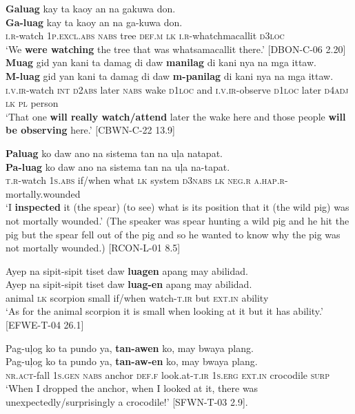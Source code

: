 \ea
\textbf{Galuag}  kay  ta  kaoy  an  na  gakuwa  don. \\\smallskip
\gll \textbf{Ga-luag}  kay  ta  kaoy  an  na  ga-kuwa  don. \\
\textsc{i.r}-watch  1\textsc{p.excl.abs}  \textsc{nabs}  tree  \textsc{def.m}  \textsc{lk}  \textsc{i.r}-whatchmacallit  \textsc{d3loc} \\
\glt ‘We \textbf{were watching} the tree that was whatsamacallit there.’ [DBON-C-06 2.20]
\z
\ea
\textbf{Muag}  gid  yan  kani  ta  damag  di  daw  \textbf{manilag} di kani  nya  na  mga  ittaw. \\\smallskip
\gll \textbf{M-luag}  gid  yan  kani  ta  damag  di  daw  \textbf{m-panilag} di kani  nya  na  mga  ittaw. \\
\textsc{i.v.ir}-watch  \textsc{int}  \textsc{d2abs}  later  \textsc{nabs}  wake  \textsc{d1loc}  and  \textsc{i.v.ir}-observe
\textsc{d1loc} later  \textsc{d4adj}  \textsc{lk}  \textsc{pl} person \\
\glt `That one \textbf{will really watch/attend} later the wake here and those people \textbf{will be observing} here.’ [CBWN-C-22 13.9]
\z

\ea
\textbf{Paluag}  ko  daw  ano  na  sistema  tan  na  uļa natapat. \\\smallskip
\gll \textbf{Pa-luag}  ko  daw  ano  na  sistema  tan  na  uļa na-tapat. \\
\textsc{t.r}-watch  1\textsc{s.abs}  if/when  what  \textsc{lk}  system  \textsc{d3nabs}  \textsc{lk}  \textsc{neg.r} \textsc{a.hap.r}-mortally.wounded \\
\glt `I \textbf{inspected} it (the spear) (to see) what is its position that it (the wild pig) was not mortally wounded.’ (The speaker was spear hunting a wild pig and he hit the pig but the spear fell out of the pig and so he wanted to know why the pig was not mortally wounded.) [RCON-L-01 8.5]
\z

\ea
Ayep  na  sipit-sipit  tiset  daw  \textbf{luagen}  apang   may  abilidad. \\\smallskip
\gll Ayep  na  sipit-sipit  tiset  daw  \textbf{luag-en}  apang   may  abilidad. \\
animal  \textsc{lk}  scorpion  small  if/when  watch-\textsc{t.ir}  but  \textsc{ext.in}  ability \\
\glt ‘As for the animal scorpion it is small when looking at it but it has ability.’ [EFWE-T-04 26.1]
\z

\ea
Pag-uļog  ko  ta  pundo   ya,  \textbf{tan-awen}  ko,  may  bwaya  plang. \\\smallskip
\gll Pag-uļog  ko  ta  pundo   ya,  \textbf{tan-aw-en}  ko,  may  bwaya  plang. \\
\textsc{nr.act}-fall  1\textsc{s.gen}  \textsc{nabs}  anchor  \textsc{def.f}  look.at-\textsc{t.ir}  1\textsc{s.erg}  \textsc{ext.in}  crocodile  \textsc{surp} \\
\glt ‘When I dropped the anchor, when I looked at it, there was unexpectedly/surprisingly a crocodile!’ [SFWN-T-03 2.9].
\z

